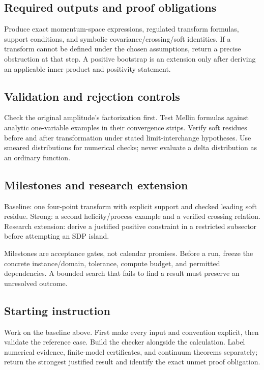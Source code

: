 \documentclass[
  11pt,
]{article}
\begin{document}
\subsection{Required outputs and proof obligations}

Produce exact momentum-space expressions, regulated transform formulas,
support conditions, and symbolic covariance/crossing/soft identities. If
a transform cannot be defined under the chosen assumptions, return a
precise obstruction at that step. A positive bootstrap is an extension
only after deriving an applicable inner product and positivity
statement.

\subsection{Validation and rejection controls}

Check the original amplitude's factorization first. Test Mellin formulas
against analytic one-variable examples in their convergence strips.
Verify soft residues before and after transformation under stated
limit-interchange hypotheses. Use smeared distributions for numerical
checks; never evaluate a delta distribution as an ordinary function.

\subsection{Milestones and research extension}

Baseline: one four-point transform with explicit support and checked
leading soft residue. Strong: a second helicity/process example and a
verified crossing relation. Research extension: derive a justified
positive constraint in a restricted subsector before attempting an SDP
island.

Milestones are acceptance gates, not calendar promises. Before a run,
freeze the concrete instance/domain, tolerance, compute budget, and
permitted dependencies. A bounded search that fails to find a result
must preserve an unresolved outcome.

\subsection{Starting instruction}

Work on the baseline above. First make every input and convention
explicit, then validate the reference case. Build the checker alongside
the calculation. Label numerical evidence, finite-model certificates,
and continuum theorems separately; return the strongest justified result
and identify the exact unmet proof obligation.
\end{document}

